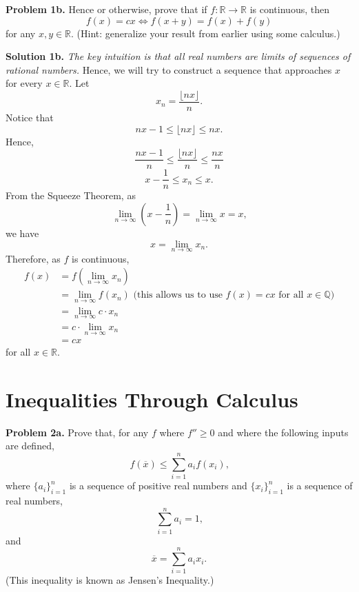 \documentclass{article}
\begin{document}
\bigskip

\noindent\textbf{Problem 1b.} Hence or otherwise, prove that if $f \colon \mathbb{R} \rightarrow \mathbb{R}$ is continuous, then
\[
    f(x) = cx \iff f(x + y) = f(x) + f(y)
\]
for any $x, y \in \mathbb{R}$. (Hint: generalize your result from earlier using some calculus.)

\bigskip

\noindent\textbf{Solution 1b.} \textit{The key intuition is that all real numbers are limits of sequences of rational numbers.} Hence, we will try to construct a sequence that approaches $x$ for every $x \in \mathbb{R}$. Let
\[
    x_n = \frac{\lfloor nx \rfloor}{n}.
\]
Notice that
\[
    nx - 1 \leq \lfloor nx \rfloor \leq nx \text{.}
\]
Hence,
\[
    \frac{nx - 1}{n} \leq \frac{\lfloor nx \rfloor}{n} \leq \frac{nx}{n}
\]
\[
   x - \frac{1}{n} \leq x_n \leq x \text{.}
\]
From the Squeeze Theorem, as
\[
    \lim_{n \rightarrow \infty} \left( x - \frac{1}{n} \right) = \lim_{n \rightarrow \infty} x = x \text{,}
\]
we have
\[
    x = \lim_{n \rightarrow \infty} x_n \text{.}
\]
Therefore, as $f$ is continuous,
\begin{equation*}
    \begin{split}
        f(x) &= f \left( \lim_{n \rightarrow \infty} x_n \right) \\
        &= \lim_{n \rightarrow \infty} f(x_n) \text{ (this allows us to use $f(x) = cx$ for all $x \in \mathbb{Q}$)} \\
        &= \lim_{n \rightarrow \infty} c \cdot x_n \\
        &= c \cdot \lim_{n \rightarrow \infty} x_n \\
        &= cx
    \end{split}
\end{equation*}
for all $x \in \mathbb{R}$.

\section{Inequalities Through Calculus}

\textbf{Problem 2a.} Prove that, for any $f$ where $f'' \geq 0$ and where the following inputs are defined,
\[
    f(\overline{x}) \leq \sum_{i=1}^{n} a_i f(x_i) \text{,}
\]
where $\{ a_i \}_{i=1}^n$ is a sequence of positive real numbers and $\{ x_i \}_{i=1}^n$ is a sequence of real numbers,
\[
    \sum_{i=1}^n a_i = 1 \text{,}
\]
and
\[
    \overline{x} = \sum_{i=1}^n a_i x_i \text{.}
\]
(This inequality is known as Jensen's Inequality.)
\end{document}
